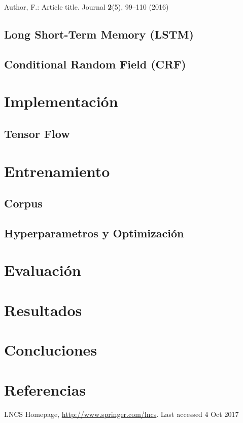 \documentclass[runningheads]{llncs}
\begin{document}
\begin{thebibliography}{8}
Author, F.: Article title. Journal \textbf{2}(5), 99--110 (2016)

\subsection{Long Short-Term Memory (LSTM)}

\subsection{Conditional Random Field (CRF)}


\section{Implementación}
\subsection{Tensor Flow}


\section{Entrenamiento}
\subsection{Corpus}
\subsection{ Hyperparametros y Optimización }

\section{Evaluación}
\section{Resultados}

\section{Concluciones}

\section{Referencias}



LNCS Homepage, \url{http://www.springer.com/lncs}. Last accessed 4
Oct 2017
\end{thebibliography}
\end{document}
